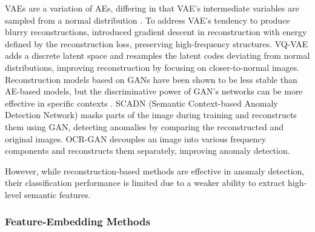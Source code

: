 VAEs are a variation of AEs, differing in that VAE's intermediate variables are sampled from a normal distribution \cite{liu2020towards, dehaene2020iterative}. To address VAE's tendency to produce blurry reconstructions, \cite{dehaene2020iterative} introduced gradient descent in reconstruction with energy defined by the reconstruction loss, preserving high-frequency structures. VQ-VAE \cite{wang2020image} adds a discrete latent space and resamples the latent codes deviating from normal distributions, improving reconstruction by focusing on closer-to-normal images. Reconstruction models based on GANs have been shown to be less stable than AE-based models, but the discriminative power of GAN's networks can be more effective in specific contexts \cite{ganokratanaa2020unsupervised, ganokratanaa2022video}. SCADN (Semantic Context-based Anomaly Detection Network) \cite{yan2021learning} masks parts of the image during training and reconstructs them using GAN, detecting anomalies by comparing the reconstructed and original images. OCR-GAN \cite{liang2023omni} decouples an image into various frequency components and reconstructs them separately, improving anomaly detection.



 However, while reconstruction-based methods are effective in anomaly detection, their classification performance is limited due to a weaker ability to extract high-level semantic features.

\subsubsection*{Feature-Embedding Methods}

